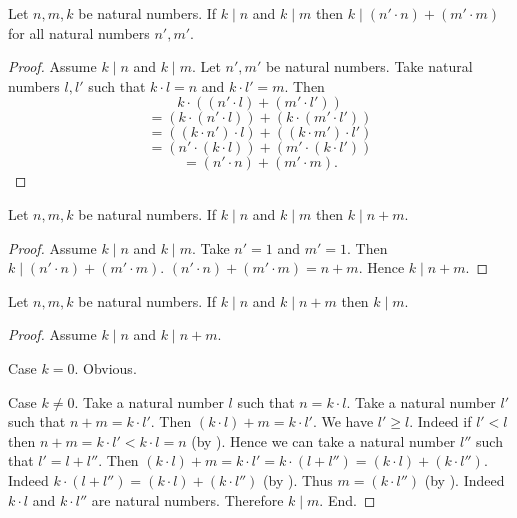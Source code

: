 \documentclass[10pt]{article}
\begin{document}
  \begin{forthel}
    \begin{proposition}
      Let $n, m, k$ be natural numbers.
      If $k \mid n$ and $k \mid m$ then $k \mid (n' \cdot n) + (m' \cdot m)$
      for all natural numbers $n', m'$.
    \end{proposition}
    \begin{proof}
      Assume $k \mid n$ and $k \mid m$.
      Let $n', m'$ be natural numbers.
      Take natural numbers $l,l'$ such that $k \cdot l = n$ and $k \cdot l' = m$.
      Then
      \[  k \cdot ((n' \cdot l) + (m' \cdot l'))                \]
      \[    = (k \cdot (n' \cdot l)) + (k \cdot (m' \cdot l'))  \]
      \[    = ((k \cdot n') \cdot l) + ((k \cdot m') \cdot l')  \]
      \[    = (n' \cdot (k \cdot l)) + (m' \cdot (k \cdot l'))  \]
      \[    = (n' \cdot n) + (m' \cdot m).                      \]
    \end{proof}
  \end{forthel}

  \begin{forthel}
    \begin{corollary}
      Let $n, m, k$ be natural numbers.
      If $k \mid n$ and $k \mid m$ then $k \mid n + m$.
    \end{corollary}
    \begin{proof}
      Assume $k \mid n$ and $k \mid m$.
      Take $n' = 1$ and $m' = 1$.
      Then $k \mid (n' \cdot n) + (m' \cdot m)$.
      $(n' \cdot n) + (m' \cdot m) = n + m$.
      Hence $k \mid n + m$.
    \end{proof}
  \end{forthel}

  \begin{forthel}
    \begin{proposition}
      Let $n, m, k$ be natural numbers.
      If $k \mid n$ and $k \mid n + m$ then $k \mid m$.
    \end{proposition}
    \begin{proof}
      Assume $k \mid n$ and $k \mid n + m$.

      Case $k = 0$. Obvious.

      Case $k \neq 0$.
        Take a natural number $l$ such that $n = k \cdot l$.
        Take a natural number $l'$ such that $n + m = k \cdot l'$.
        Then $(k \cdot l) + m = k \cdot l'$.
        We have $l' \geq l$.
        Indeed if $l' < l$ then
        $n + m
          = k \cdot l'
          < k \cdot l
          = n$ (by ).
        Hence we can take a natural number $l''$ such that $l' = l + l''$.
        Then $(k \cdot l) + m
          = k \cdot l'
          = k \cdot (l + l'')
          = (k \cdot l) + (k \cdot l'')$.
        Indeed $k \cdot (l + l'') = (k \cdot l) + (k \cdot l'')$ (by ).
        Thus $m = (k \cdot l'')$ (by ).
        Indeed $k \cdot l$ and $k \cdot l''$ are natural numbers.
        Therefore $k \mid m$.
      End.
    \end{proof}
  \end{forthel}
\end{document}
